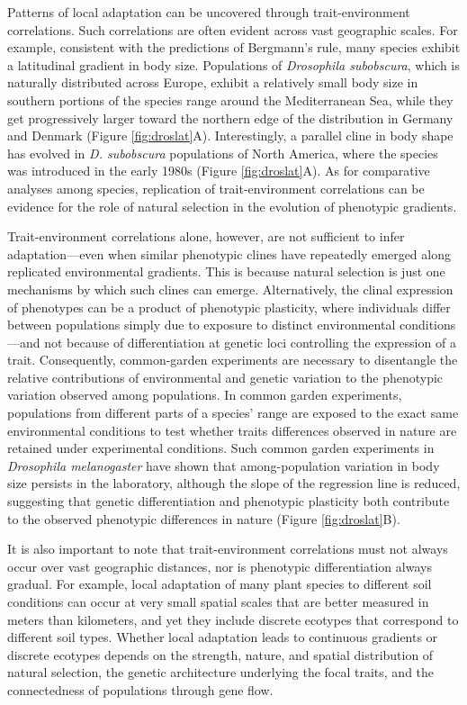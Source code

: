 \documentclass[
]{book}
\begin{document}
Patterns of local adaptation can be uncovered through trait-environment correlations. Such correlations are often evident across vast geographic scales. For example, consistent with the predictions of Bergmann's rule, many species exhibit a latitudinal gradient in body size. Populations of \emph{Drosophila subobscura}, which is naturally distributed across Europe, exhibit a relatively small body size in southern portions of the species range around the Mediterranean Sea, while they get progressively larger toward the northern edge of the distribution in Germany and Denmark (Figure \ref{fig:droslat}A). Interestingly, a parallel cline in body shape has evolved in \emph{D. subobscura} populations of North America, where the species was introduced in the early 1980s (Figure \ref{fig:droslat}A). As for comparative analyses among species, replication of trait-environment correlations can be evidence for the role of natural selection in the evolution of phenotypic gradients.

Trait-environment correlations alone, however, are not sufficient to infer adaptation---even when similar phenotypic clines have repeatedly emerged along replicated environmental gradients. This is because natural selection is just one mechanisms by which such clines can emerge. Alternatively, the clinal expression of phenotypes can be a product of phenotypic plasticity, where individuals differ between populations simply due to exposure to distinct environmental conditions---and not because of differentiation at genetic loci controlling the expression of a trait. Consequently, common-garden experiments are necessary to disentangle the relative contributions of environmental and genetic variation to the phenotypic variation observed among populations. In common garden experiments, populations from different parts of a species' range are exposed to the exact same environmental conditions to test whether traits differences observed in nature are retained under experimental conditions. Such common garden experiments in \emph{Drosophila melanogaster} have shown that among-population variation in body size persists in the laboratory, although the slope of the regression line is reduced, suggesting that genetic differentiation and phenotypic plasticity both contribute to the observed phenotypic differences in nature (Figure \ref{fig:droslat}B).

It is also important to note that trait-environment correlations must not always occur over vast geographic distances, nor is phenotypic differentiation always gradual. For example, local adaptation of many plant species to different soil conditions can occur at very small spatial scales that are better measured in meters than kilometers, and yet they include discrete ecotypes that correspond to different soil types. Whether local adaptation leads to continuous gradients or discrete ecotypes depends on the strength, nature, and spatial distribution of natural selection, the genetic architecture underlying the focal traits, and the connectedness of populations through gene flow.
\end{document}
